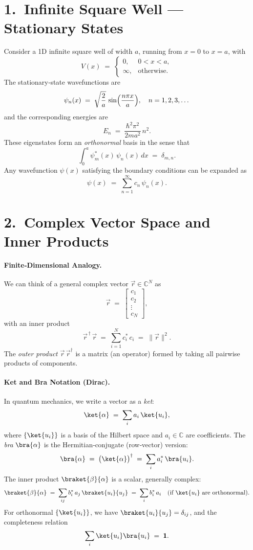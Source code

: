 \section*{1.\ Infinite Square Well --- Stationary States}

Consider a 1D infinite square well of width $a$, running from $x=0$ to $x=a$, with 
\[
V(x) \;=\; 
\begin{cases}
0, & 0 < x < a,\\
\infty, & \text{otherwise}.
\end{cases}
\]
The stationary‐state wavefunctions are
\[
\psi_n(x) 
\;=\; 
\sqrt{\frac{2}{a}}\,
\sin\Bigl(\frac{n \pi x}{a}\Bigr),
\quad
n = 1,2,3,\dots
\]
and the corresponding energies are 
\[
E_n 
\;=\;
\frac{\hbar^2 \pi^2}{2 m a^2}\,n^2.
\]
These eigenstates form an \emph{orthonormal} basis in the sense that
\[
\int_{0}^{a}\psi_m^*(x)\,\psi_n(x)\,dx 
\;=\;\delta_{m,n}.
\]
Any wavefunction $\psi(x)$ satisfying the boundary conditions can be expanded as
\[
\psi(x) \;=\; \sum_{n=1}^{\infty} c_n\,\psi_n(x).
\]

\section*{2.\ Complex Vector Space and Inner Products}

\paragraph{Finite‐Dimensional Analogy.}
We can think of a general complex vector 
\(\vec{r} \in \mathbb{C}^N\) as
\[
\vec{r} 
\;=\;
\begin{bmatrix}
c_1\\ 
c_2\\
\vdots\\
c_N
\end{bmatrix},
\]
with an inner product 
\[
\vec{r}^{\,\dagger}\,\vec{r} 
\;=\; 
\sum_{i=1}^N c_i^*\,c_i 
\;=\; 
\|\vec{r}\|^2.
\]
The \emph{outer product} $\vec{r}\,\vec{r}^\dagger$ is a matrix (an operator) formed by taking all pairwise products of components.

\paragraph{Ket and Bra Notation (Dirac).}
In quantum mechanics, we write a vector as a \emph{ket}:
\[
\ket{\alpha}
\;=\;
\sum_{i} a_i \,\ket{u_i},
\]
where $\{\ket{u_i}\}$ is a basis of the Hilbert space and $a_i \in \mathbb{C}$ are coefficients.  The \emph{bra} $\bra{\alpha}$ is the Hermitian‐conjugate (row‐vector) version:
\[
\bra{\alpha} 
\;=\;
\bigl(\ket{\alpha}\bigr)^\dagger
\;=\;
\sum_{i} a_i^*\,\bra{u_i}.
\]
The inner product $\braket{\beta}{\alpha}$ is a scalar, generally complex:
\[
\braket{\beta}{\alpha} 
\;=\;
\sum_{ij} b_i^*\, a_j\,\braket{u_i}{u_j}
\;=\;
\sum_i b_i^* \, a_i
\quad
(\text{if }\ket{u_i}\text{ are orthonormal}). 
\]
For orthonormal $\{\ket{u_i}\}$, we have $\braket{u_i}{u_j} = \delta_{ij}$, and the completeness relation
\[
\sum_{i}\ket{u_i}\bra{u_i} 
\;=\; 
\mathbf{1}.
\]


